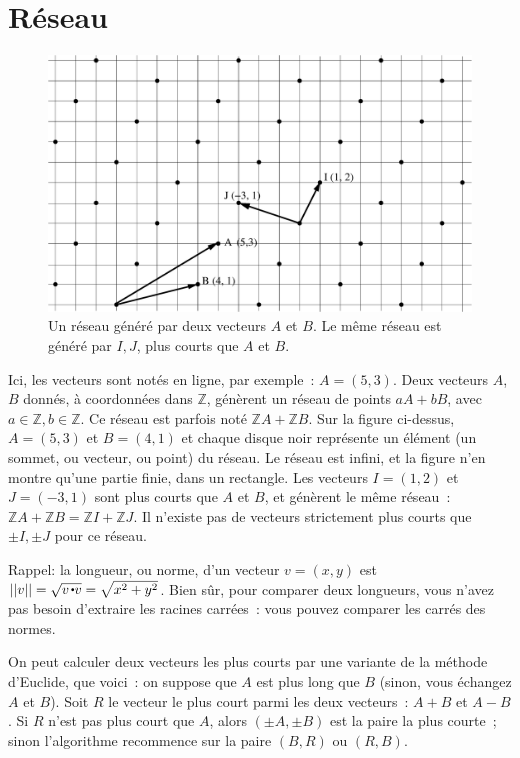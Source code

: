 \documentclass[11pt]{article}
\def\Z{\mathbb Z}
\begin{document}
{
\section{Réseau}
{
\begin{figure}
\begin{center}
\includegraphics[width=0.99\linewidth]{dessin3.eps}
\end{center}

\caption{ Un réseau  généré par deux vecteurs $A$ et $B$. Le même réseau est  généré par $I, J$, plus courts que $A$ et $B$. }
\end{figure}
}
Ici, les vecteurs sont notés en ligne, par exemple~: $A=(5, 3)$.
Deux vecteurs $A$, $B$ donnés, à coordonnées dans $\Z$,
génèrent un réseau de points $aA + bB$, avec $a\in \Z, b\in\Z$. 
Ce réseau est parfois noté $\Z A + \Z B$.
Sur la figure ci-dessus, $A=(5, 3)$ et $B=(4, 1)$ et chaque disque noir  représente
un élément (un sommet, ou vecteur, ou point) du réseau. Le réseau est infini, et la figure n'en montre qu'une partie finie, dans un rectangle. 
Les
vecteurs  $I=(1, 2)$ et $J=(-3, 1)$ sont plus courts que $A$ et $B$, et génèrent le même réseau~: $\Z A + \Z B = \Z I + \Z J$. 
Il n'existe pas de vecteurs strictement plus courts que $\pm I, \pm J$ pour ce réseau. 

Rappel: la longueur, ou norme, d'un vecteur $v=(x, y)$ est $||v||=\sqrt{v \smallbullet v}=\sqrt{x^2+y^2}$.
Bien sûr, pour comparer deux longueurs, vous n'avez pas besoin d'extraire les racines carrées~: vous pouvez comparer les carrés des normes.


On peut calculer
deux vecteurs les plus courts 
par une variante de la méthode d'Euclide, que voici~:
on suppose que $A$ est plus long que $B$ (sinon, vous échangez $A$ et $B$).  Soit $R$ le vecteur le plus court parmi  les deux vecteurs~: 
$A + B$ et $A -B$.
Si $R$ n'est pas plus court que $A$, alors $(\pm A, \pm B)$ est la
paire la plus courte~; sinon l'algorithme recommence sur la paire $(B, R)$ ou $(R, B)$. 

}
\end{document}
